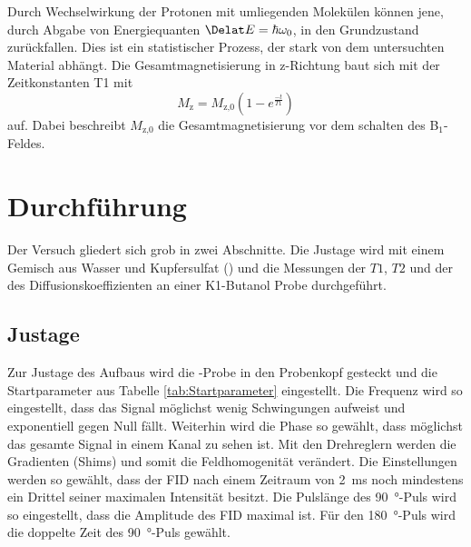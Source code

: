 Durch Wechselwirkung der Protonen mit umliegenden Molekülen können jene, durch Abgabe von Energiequanten $\Delat E = \hbar \omega_0$, in den Grundzustand zurückfallen.
Dies ist ein statistischer Prozess, der stark von dem untersuchten Material abhängt.
Die Gesamtmagnetisierung in z-Richtung baut sich mit der Zeitkonstanten T1 mit
\begin{equation}
  M_\text{z} = M_\text{z,0} (1-e^{\frac{-t}{T1}})
\end{equation}
auf. Dabei beschreibt $M_\text{z,0}$ die Gesamtmagnetisierung vor dem schalten des B$_1$-Feldes.














\section{Durchführung}
Der Versuch gliedert sich grob in zwei Abschnitte. Die Justage wird mit einem Gemisch aus Wasser und Kupfersulfat () und die Messungen der $T1$, $T2$ und der des Diffusionskoeffizienten an einer K1-Butanol Probe durchgeführt.

\subsection{Justage}
Zur Justage des Aufbaus wird die -Probe in den Probenkopf gesteckt und die Startparameter aus Tabelle \ref{tab:Startparameter} eingestellt.
Die Frequenz wird so eingestellt, dass das Signal möglichst wenig Schwingungen aufweist und exponentiell gegen Null fällt.
Weiterhin wird die Phase so gewählt, dass möglichst das gesamte Signal in einem Kanal zu sehen ist.
Mit den Drehreglern werden die Gradienten (Shims) und somit die Feldhomogenität verändert. Die Einstellungen werden so gewählt, dass der FID nach einem Zeitraum von \SI{2}{\milli\second} noch mindestens ein Drittel seiner maximalen Intensität besitzt.
Die Pulslänge des \SI{90}{\degree}-Puls wird so eingestellt, dass die Amplitude des FID maximal ist. Für den \SI{180}{\degree}-Puls wird die doppelte Zeit des \SI{90}{\degree}-Puls gewählt.

